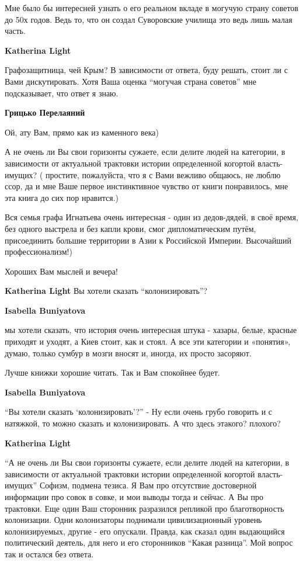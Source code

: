 \begin{itemize}
\begin{itemize}
\begin{itemize}
Мне было бы интересней узнать о его реальном вкладе в могучую страну советов до
50х годов. Ведь то, что он создал Суворовские училища это ведь лишь малая
часть.


\textbf{Katherina Light} 

Графозащитница, чей Крым? В зависимости от ответа, буду решать, стоит ли с Вами
дискутировать. Хотя Ваша оценка \enquote{могучая страна советов} мне подсказывает, что
ответ я знаю.


\textbf{Грицько Перелаяний} 

Ой, ату Вам, прямо как из каменного века)

А не очень ли Вы свои горизонты сужаете, если делите людей на категории, в
зависимости от актуальной трактовки истории определенной когортой
власть-имущих? ( простите, пожалуйста, что я с Вами вежливо общаюсь, не люблю
ссор, да и мне Ваше первое инстинктивное чувство от книги понравилось, мне эта
книга до сих пор нравится.)

Вся семья графа Игнатьева очень интересная - один из дедов-дядей, в своё время,
без одного выстрела и без капли крови, смог дипломатическим путём, присоединить
большие территории в Азии к Российской Империи. Высочайший профессионализм!)

Хороших Вам мыслей и вечера!


\textbf{Katherina Light} Вы хотели сказать \enquote{колонизировать}?

\textbf{Isabella Buniyatova} 

мы хотели сказать, что история очень интересная штука - хазары, белые, красные
приходят и уходят, а Киев стоит, как и стоял. А все эти категории и «понятия»,
думаю, только сумбур в мозги вносят и, иногда, их просто засоряют.

Лучше книжки хорошие читать. Так и Вам спокойнее будет.

\textbf{Isabella Buniyatova} 

\enquote{Вы хотели сказать \enquote{колонизировать}?} - Ну если очень грубо говорить и с
натяжкой, то можно сказать и колонизировать. А что здесь этакого? плохого?


\textbf{Katherina Light} 

\enquote{А не очень ли Вы свои горизонты сужаете, если делите людей на категории, в
зависимости от актуальной трактовки истории определенной когортой
власть-имущих} Софизм, подмена тезиса. Я Вам про отсутствие достоверной
информации про совок в совке, и мои выводы тогда и сейчас. А Вы про трактовки.
Еще один Ваш сторонник разразился репликой про благотворность колонизации. Одни
колонизаторы поднимали цивилизационный уровень колонизируемых, другие - его
опускали. Правда, как сказал один выдающийся политический деятель, для него и
его сторонников \enquote{Какая разница}. Мой вопрос так и остался без ответа.


\end{itemize}
\end{itemize}
\end{itemize}
